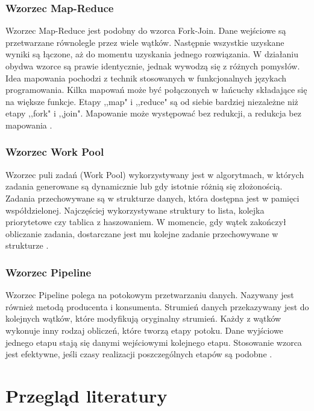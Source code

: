 \documentclass[12pt]{article}
\begin{document}
\subsubsection{Wzorzec Map-Reduce}
Wzorzec Map-Reduce jest podobny do wzorca Fork-Join. Dane wejściowe są przetwarzane równolegle przez wiele wątków.
Następnie wszystkie uzyskane wyniki są łączone, aż do momentu uzyskania jednego rozwiązania.
W działaniu obydwa wzorce są prawie identycznie, jednak wywodzą się z różnych pomysłów.
Idea mapowania pochodzi z technik stosowanych w funkcjonalnych językach programowania.
Kilka mapowań może być połączonych w łańcuchy składające się na większe funkcje.
Etapy ,,map" i ,,reduce" są od siebie bardziej niezależne niż etapy ,,fork" i ,,join".
Mapowanie może występować bez redukcji, a redukcja bez mapowania \cite{parallel-design-patterns}.

\subsubsection{Wzorzec Work Pool}
Wzorzec puli zadań (Work Pool) wykorzystywany jest w algorytmach, w których zadania generowane są dynamicznie
lub gdy istotnie różnią się złożonością. Zadania przechowywane są w strukturze danych, która dostępna
jest w pamięci współdzielonej. Najczęściej wykorzystywane struktury to lista, kolejka priorytetowe
czy tablica z haszowaniem. W momencie, gdy wątek zakończył obliczanie zadania, dostarczane jest mu
kolejne zadanie przechowywane w strukturze \cite{wprowadzenie-do-obliczen-rownoleglych}.

\subsubsection{Wzorzec Pipeline}
Wzorzec Pipeline polega na potokowym przetwarzaniu danych. Nazywany jest również metodą producenta
i konsumenta. Strumień danych przekazywany jest do kolejnych wątków, które modyfikują oryginalny strumień.
Każdy z wątków wykonuje inny rodzaj obliczeń, które tworzą etapy potoku. Dane wyjściowe jednego etapu
stają się danymi wejściowymi kolejnego etapu. Stosowanie wzorca jest efektywne, jeśli czasy realizacji
poszczególnych etapów są podobne \cite{wprowadzenie-do-obliczen-rownoleglych}.

\newpage

\section{Przegląd literatury}
\end{document}
